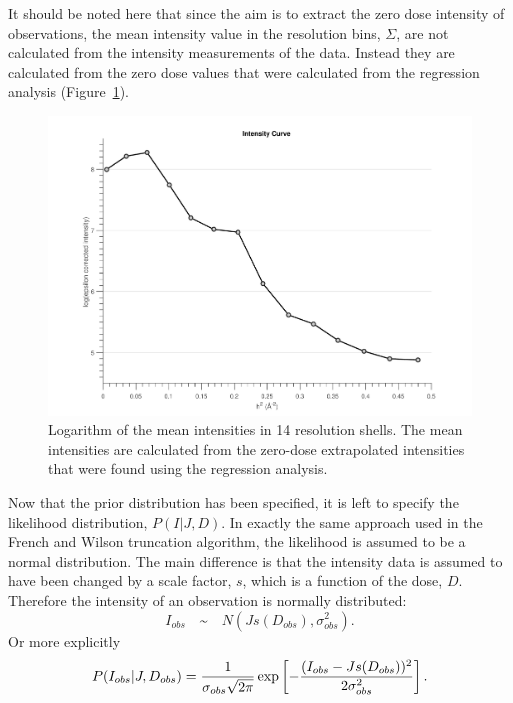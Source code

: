 It should be noted here that since the aim is to extract the zero dose intensity of observations, the mean intensity value in the resolution bins, $\Sigma$, are not calculated from the intensity measurements of the data.
Instead they are calculated from the zero dose values that were calculated from the regression analysis (Figure~\ref{fig:Zero-dose mean intensity in resolution shells - Extrapolation method}).
\begin{figure}
  \centering
    \includegraphics[width=1\textwidth]{figures/zde/extrapolationscaling.pdf}
    \caption{Logarithm of the mean intensities in 14 resolution shells.
    The mean intensities are calculated from the zero-dose extrapolated intensities that were found using the regression analysis.}
    \label{fig:Zero-dose mean intensity in resolution shells - Extrapolation method}
\end{figure}

Now that the prior distribution has been specified, it is left to specify the likelihood distribution, $P(I | J, D)$.
In exactly the same approach used in the French and Wilson truncation algorithm, the likelihood is assumed to be a normal distribution.
The main difference is that the intensity data is assumed to have been changed by a scale factor, $s$, which is a function of the dose, $D$.
Therefore the intensity of an observation is normally distributed:
\begin{equation}
    I_{obs} \quad \text{\textasciitilde} \quad N(Js(D_{obs}),\sigma_{obs}^2).
    \label{eq:Normally distributed intensity - Extrapolation method}
\end{equation}
Or more explicitly
\begin{equation}
    P(I_{obs} | J, D_{obs}) = \frac{1}{\sigma_{obs} \sqrt{2\pi}} \exp \left[-\frac{(I_{obs} - J s(D_{obs}))^2}{2 \sigma^2_{obs}} \right].
    \label{eq:Normally distributed intensity full equation - Extrapolation method}
\end{equation}

